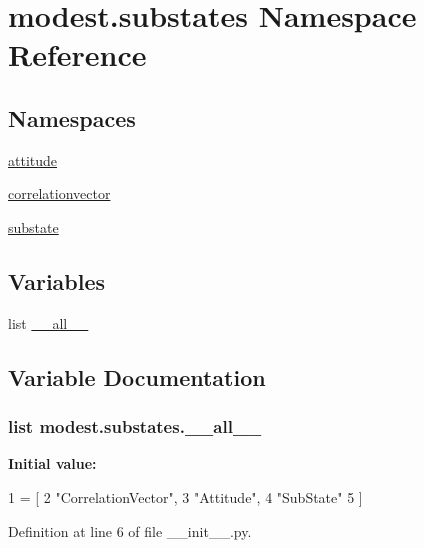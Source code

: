 \hypertarget{namespacemodest_1_1substates}{}\section{modest.\+substates Namespace Reference}
\label{namespacemodest_1_1substates}
\subsection*{Namespaces}
\begin{DoxyCompactItemize}
\item 
 \hyperlink{namespacemodest_1_1substates_1_1attitude}{attitude}
\item 
 \hyperlink{namespacemodest_1_1substates_1_1correlationvector}{correlationvector}
\item 
 \hyperlink{namespacemodest_1_1substates_1_1substate}{substate}
\end{DoxyCompactItemize}
\subsection*{Variables}
\begin{DoxyCompactItemize}
\item 
list \hyperlink{namespacemodest_1_1substates_a63be689023d94e7614e63706168d6e5e}{\+\_\+\+\_\+all\+\_\+\+\_\+}
\end{DoxyCompactItemize}


\subsection{Variable Documentation}
\subsubsection[{\texorpdfstring{\+\_\+\+\_\+all\+\_\+\+\_\+}{__all__}}]{\setlength{\rightskip}{0pt plus 5cm}list modest.\+substates.\+\_\+\+\_\+all\+\_\+\+\_\+\hspace{0.3cm}{\ttfamily [private]}}\hypertarget{namespacemodest_1_1substates_a63be689023d94e7614e63706168d6e5e}{}\label{namespacemodest_1_1substates_a63be689023d94e7614e63706168d6e5e}
{\bfseries Initial value\+:}
\begin{DoxyCode}
1 = [
2     \textcolor{stringliteral}{"CorrelationVector"},
3     \textcolor{stringliteral}{"Attitude"},
4     \textcolor{stringliteral}{"SubState"}
5 ]
\end{DoxyCode}


Definition at line 6 of file \+\_\+\+\_\+init\+\_\+\+\_\+.\+py.

